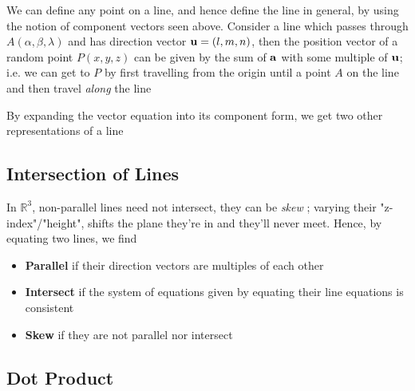 \documentclass[english,course,draft]{Notes}
\newcommand{\real}{\mathbb{R}}
\newcommand{\ita}[1]{\textit{#1}}
\begin{document}

\par{We can define any point on a line, and hence define the line in general, by using the notion of component vectors seen above. Consider a line which passes through $A(\alpha, \beta, \lambda)$ and has direction vector $\mathbf{u} = (l,m,n)$, then the position vector of a random point $P(x,y,z)$ can be given by the sum of $\mathbf{a}$ with some multiple of $\mathbf{u}$; i.e. we can get to $P$ by first travelling from the origin until a point $A$ on the line and then travel \ita{along} the line}


\par{By expanding the vector equation into its component form, we get two other representations of a line}




\subsection{Intersection of Lines}

\par{In $\real^3$, non-parallel lines need not intersect, they can be \ita{skew} ; varying their "z-index"/"height", shifts the plane they're in and they'll never meet. Hence, by equating two lines, we find}

\begin{itemize}
\item[] \textbf{Parallel} if their direction vectors are multiples of each other
\item[] \textbf{Intersect} if the system of equations given by equating their line equations is consistent
\item[] \textbf{Skew} if they are not parallel nor intersect
\end{itemize}

\subsection{Dot Product}
\end{document}
